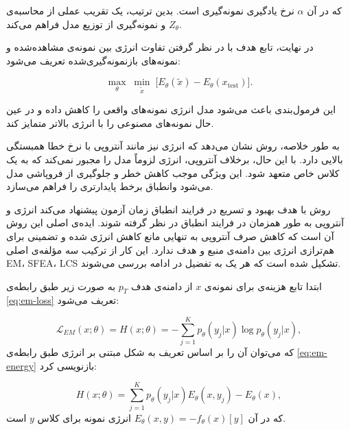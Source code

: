 که در آن \(\alpha\) نرخ یادگیری نمونه‌گیری است. 
بدین ترتیب،  یک تقریب عملی از محاسبه‌ی \(Z_{\theta}\) و نمونه‌گیری از توزیع مدل فراهم می‌کند. 

در نهایت، تابع هدف  با در نظر گرفتن تفاوت انرژی بین نمونه‌ی مشاهده‌شده و نمونه‌های بازنمونه‌گیری‌شده تعریف می‌شود:  

\begin{equation}
	\max_{\theta} \; \min_{\tilde{x}} \; 
	\big[E_{\theta}(\tilde{x}) - E_{\theta}(x_{\text{test}})\big].
	\label{eq:tea-loss}
\end{equation}

این فرمول‌بندی باعث می‌شود مدل انرژی نمونه‌های واقعی را کاهش داده و در عین حال نمونه‌های مصنوعی را با انرژی بالاتر متمایز کند.  

به طور خلاصه، روش  نشان می‌دهد که انرژی نیز مانند آنتروپی با نرخ خطا همبستگی بالایی دارد. 
با این حال، برخلاف آنتروپی، انرژی لزوماً مدل را مجبور نمی‌کند که به یک کلاس خاص متعهد شود.
این ویژگی موجب کاهش خطر  و جلوگیری از فروپاشی مدل می‌شود 
وانطباق برخط پایدارتری را فراهم می‌سازد.


روش  با هدف بهبود و تسریع در فرایند انطباق زمان آزمون پیشنهاد می‌کند انرژی و آنتروپی به طور همزمان در فرایند انطباق در نظر گرفته شوند.
ایده‌ی اصلی این روش آن است که کاهش صرف آنتروپی به تنهایی مانع کاهش انرژی شده و تضمینی برای هم‌ترازی انرژی بین دامنه‌ی منبع و هدف ندارد. 
این کار از ترکیب سه مؤلفه‌ی اصلی {EM}، {SFEA}، {LCS} تشکیل شده است که هر یک به تفضیل در ادامه بررسی می‌شوند.

ابتدا تابع هزینه‌ی  برای نمونه‌ی $x$ از دامنه‌ی هدف $p_T$ به صورت زیر طبق رابطه‌ی \ref{eq:em-loss} تعریف می‌شود\cite{aea}:

\begin{equation}
	\mathcal{L}_{EM}(x; \theta) = H(x; \theta) 
	= -\sum_{j=1}^{K} p_{\theta}(y_j|x) \log p_{\theta}(y_j|x),
	\label{eq:em-loss}
\end{equation}
که می‌توان آن را بر اساس تعریف  به شکل مبتنی بر انرژی طبق رابطه‌ی \ref{eq:em-energy} بازنویسی کرد\cite{aea}:

\begin{equation}
	H(x; \theta) = \sum_{j=1}^{K} p_{\theta}(y_j|x) E_{\theta}(x, y_j) - E_{\theta}(x),
	\label{eq:em-energy}
\end{equation}
که در آن $E_{\theta}(x,y) = -f_{\theta}(x)[y]$ انرژی نمونه برای کلاس $y$ است.

